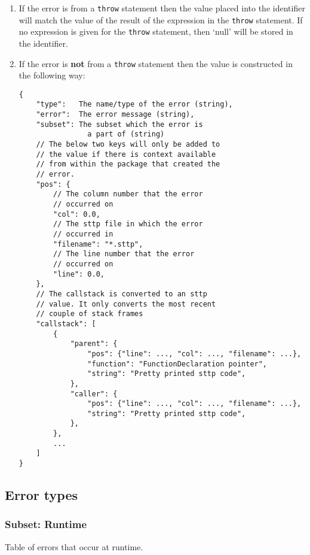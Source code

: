 \begin{enumerate}
    \item If the error is from a \verb|throw| statement then the value placed into the identifier will match the value of the result of the expression in the \verb|throw| statement. If no expression is given for the \verb|throw| statement, then `null' will be stored in the identifier.
    \item If the error is \textbf{not} from a \verb|throw| statement then the value is constructed in the following way:
    \begin{center}
        \begin{verbatim}
{
    "type":   The name/type of the error (string),
    "error":  The error message (string),
    "subset": The subset which the error is 
                a part of (string)
    // The below two keys will only be added to
    // the value if there is context available
    // from within the package that created the
    // error.
    "pos": {
        // The column number that the error
        // occurred on
        "col": 0.0,
        // The sttp file in which the error
        // occurred in
        "filename": "*.sttp",
        // The line number that the error
        // occurred on
        "line": 0.0,
    },
    // The callstack is converted to an sttp 
    // value. It only converts the most recent
    // couple of stack frames
    "callstack": [
        {
            "parent": {
                "pos": {"line": ..., "col": ..., "filename": ...},
                "function": "FunctionDeclaration pointer",
                "string": "Pretty printed sttp code",
            },
            "caller": {
                "pos": {"line": ..., "col": ..., "filename": ...},
                "string": "Pretty printed sttp code",
            },
        },
        ...
    ]
}
        \end{verbatim}
    \end{center}
\end{enumerate}

\subsection{Error types}

\subsubsection{Subset: Runtime}

Table of errors that occur at runtime.

